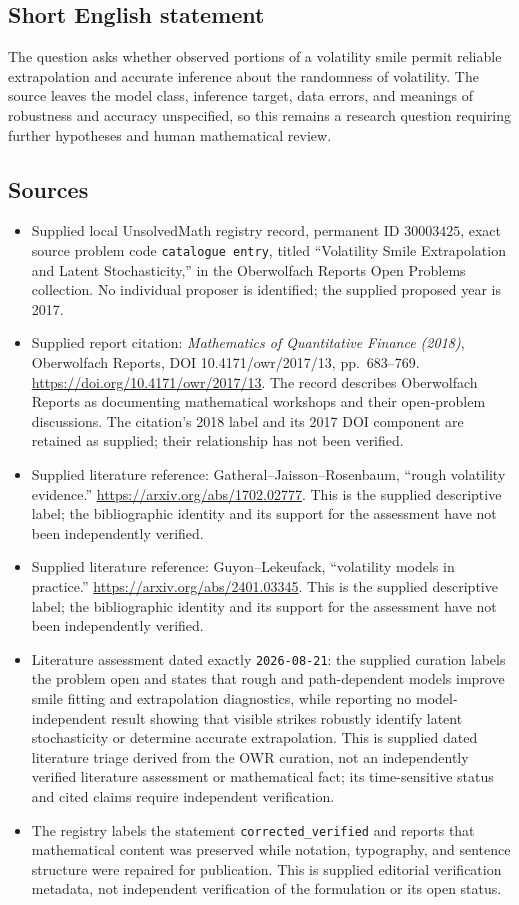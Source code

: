 \documentclass[11pt]{article}
\begin{document}
\subsection{Short English statement}
The question asks whether observed portions of a volatility smile permit reliable extrapolation and accurate inference about the randomness of volatility. The source leaves the model class, inference target, data errors, and meanings of robustness and accuracy unspecified, so this remains a research question requiring further hypotheses and human mathematical review.
\subsection{Sources}
\begin{itemize}
\item Supplied local UnsolvedMath registry record, permanent ID \(30003425\), exact source problem code \texttt{catalogue entry}, titled ``Volatility Smile Extrapolation and Latent Stochasticity,'' in the Oberwolfach Reports Open Problems collection. No individual proposer is identified; the supplied proposed year is 2017.
\item Supplied report citation: \emph{Mathematics of Quantitative Finance (2018)}, Oberwolfach Reports, DOI 10.4171/owr/2017/13, pp.\ 683--769. \url{https://doi.org/10.4171/owr/2017/13}. The record describes Oberwolfach Reports as documenting mathematical workshops and their open-problem discussions. The citation's 2018 label and its 2017 DOI component are retained as supplied; their relationship has not been verified.
\item Supplied literature reference: Gatheral--Jaisson--Rosenbaum, ``rough volatility evidence.'' \url{https://arxiv.org/abs/1702.02777}. This is the supplied descriptive label; the bibliographic identity and its support for the assessment have not been independently verified.
\item Supplied literature reference: Guyon--Lekeufack, ``volatility models in practice.'' \url{https://arxiv.org/abs/2401.03345}. This is the supplied descriptive label; the bibliographic identity and its support for the assessment have not been independently verified.
\item Literature assessment dated exactly \texttt{2026-08-21}: the supplied curation labels the problem open and states that rough and path-dependent models improve smile fitting and extrapolation diagnostics, while reporting no model-independent result showing that visible strikes robustly identify latent stochasticity or determine accurate extrapolation. This is supplied dated literature triage derived from the OWR curation, not an independently verified literature assessment or mathematical fact; its time-sensitive status and cited claims require independent verification.
\item The registry labels the statement \texttt{corrected\_verified} and reports that mathematical content was preserved while notation, typography, and sentence structure were repaired for publication. This is supplied editorial verification metadata, not independent verification of the formulation or its open status.
\end{itemize}
\end{document}
